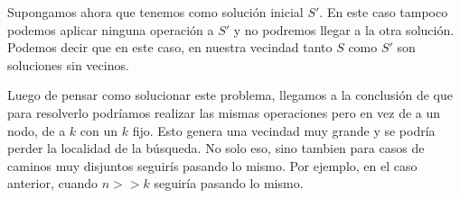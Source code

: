 Supongamos ahora que tenemos como solución inicial $S'$. En este caso tampoco podemos aplicar ninguna operación a $S'$ y no podremos llegar a la otra solución. Podemos decir que en este caso, en nuestra vecindad tanto $S$ como $S'$ son soluciones sin vecinos.

Luego de pensar como solucionar este problema, llegamos a la conclusión de que para resolverlo podríamos realizar las mismas operaciones pero en vez de a un nodo, de a $k$ con un $k$ fijo. Esto genera una vecindad muy grande y se podría perder la localidad de la búsqueda. No solo eso, sino tambien para casos de caminos muy disjuntos seguirís pasando lo mismo. Por ejemplo, en el caso anterior, cuando $n >> k$ seguiría pasando lo mismo.
